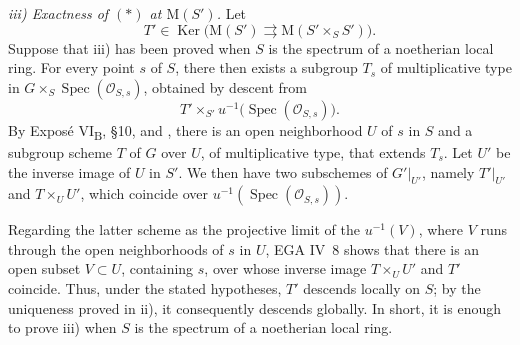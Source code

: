 
\smallskip
\noindent\textit{iii) Exactness of  \((*)\) at
\(\mathrm M(S')\).}\quad
Let
\[
  T'\in\operatorname{Ker}\bigl(
    \mathrm M(S')\rightrightarrows
    \mathrm M(S'\times_S S')\bigr).
\]
Suppose that iii) has been proved when \(S\) is the spectrum of a
noetherian local ring. For every point \(s\) of \(S\), there then
exists a subgroup \(T_s\) of multiplicative type in
\(G\times_S\operatorname{Spec}(\mathcal O_{S,s})\), obtained by
descent from
\[
  T'\times_{S'}u^{-1}\!\bigl(\operatorname{Spec}(\mathcal O_{S,s})\bigr).
\]
By Exposé VI\textsubscript{B}, \S10, and , there is an open
neighborhood \(U\) of \(s\) in \(S\) and a subgroup scheme \(T\) of
\(G\) over \(U\), of multiplicative type, that extends \(T_s\).
Let \(U'\) be the inverse image of \(U\) in \(S'\). We then have two
subschemes of \(G'|_{U'}\), namely \(T'|_{U'}\) and
\(T\times_U U'\), which coincide over
\(u^{-1}(\operatorname{Spec}(\mathcal O_{S,s}))\).

Regarding the latter scheme as the projective limit of the
\(u^{-1}(V)\), where \(V\) runs through the open neighborhoods of
\(s\) in \(U\), EGA IV~8 shows that there is an open subset
\(V\subset U\), containing \(s\), over whose inverse image
\(T\times_U U'\) and \(T'\) coincide. Thus, under the stated
hypotheses, \(T'\) descends locally on \(S\); by the uniqueness
proved in ii), it consequently descends globally. In short, it is
enough to prove iii) when \(S\) is the spectrum of a noetherian
local ring.

